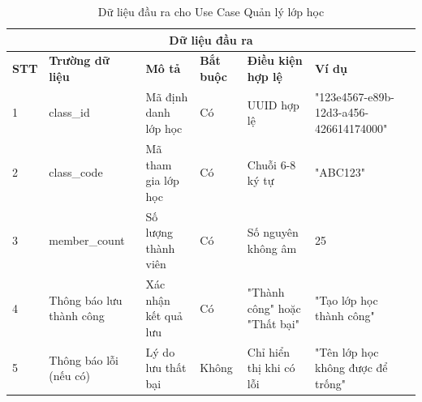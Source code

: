 \documentclass[../DoAn.tex]{subfiles}
\begin{document}
\vspace{0.5cm}

\begin{table}[h!]
\centering
\begin{tabular}{|m{1cm}|m{2.5cm}|m{3cm}|m{1cm}|m{2.5cm}|m{3.5cm}|}
    \hline
    \multicolumn{6}{|c|}{\textbf{Dữ liệu đầu ra}} \\
    \hline
    \textbf{STT} & \textbf{Trường dữ liệu} & \textbf{Mô tả} & \textbf{Bắt buộc} & \textbf{Điều kiện hợp lệ} & \textbf{Ví dụ} \\
    \hline
    1 & class\_id & Mã định danh lớp học & Có & UUID hợp lệ & "123e4567-e89b-12d3-a456-426614174000" \\
    \hline
    2 & class\_code & Mã tham gia lớp học & Có & Chuỗi 6-8 ký tự & "ABC123" \\
    \hline
    3 & member\_count & Số lượng thành viên & Có & Số nguyên không âm & 25 \\
    \hline
    4 & Thông báo lưu thành công & Xác nhận kết quả lưu & Có & "Thành công" hoặc "Thất bại" & "Tạo lớp học thành công" \\
    \hline
    5 & Thông báo lỗi (nếu có) & Lý do lưu thất bại & Không & Chỉ hiển thị khi có lỗi & "Tên lớp học không được để trống" \\
    \hline
\end{tabular}
\caption{Dữ liệu đầu ra cho Use Case Quản lý lớp học}
\end{table}
\end{document}
